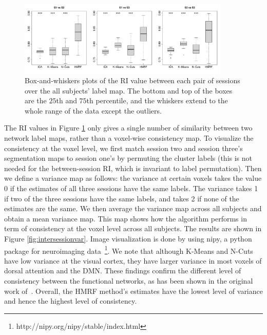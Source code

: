\documentclass[review,authoryear]{elsarticle}
\begin{document}
\begin{figure}[htb]
  \centering
  \includegraphics[width=0.9\textwidth]{figures/rainlog/boxplot}
  \caption{Box-and-whiskers plots of the RI value between each pair of
    sessions over the all subjects' label map. The bottom and top of the boxes are
    the $25$th and $75$th percentile, and the whiskers extend to the whole
    range of the data except the outliers.}
  \label{fig:sessionbox}
\end{figure}

The RI values in Figure \ref{fig:sessionbox} only gives a single number of
similarity between two network label maps, rather than a voxel-wise consistency
map. To visualize the consistency at the voxel level, we first match session two
and session three's segmentation maps to session one's by permuting the cluster
labels (this is not needed for the between-session RI, which is invariant to
label permutation).  Then we define a variance map as follows: the variance at
certain voxels takes the value 0 if the estimates of all three sessions have the
same labels. The variance takes 1 if two of the three sessions have the same
labels, and takes 2 if none of the estimates are the same. We then average the
variance map across all subjects and obtain a mean variance map. This map shows
how the algorithm performs in term of consistency at the voxel level across all
subjects. The results are shown in Figure \ref{fig:intersessionvar}.  Image
visualization is done by using nipy, a python package for neuroimaging
data~\footnote{http://nipy.org/nipy/stable/index.html}. We note that
although K-Means and N-Cuts have low variance at the visual cortex, they have
larger variance in most voxels of dorsal attention and the DMN. These findings
confirm the different level of consistency between the functional networks, as
has been shown in the original work of~\citet{zuo2010reliable}. Overall, the
HMRF method's estimates have the lowest level of variance and hence the highest
level of consistency.
\end{document}
